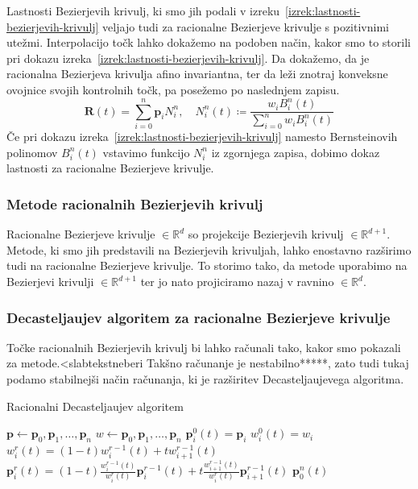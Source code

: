 \documentclass[isrm2, tisk]{fmfdelo}
\newcommand{\R}{\mathbb R}
\newcommand{\p}{\textbf{p}}
\begin{document}
    Lastnosti Bezierjevih krivulj, ki smo jih podali v izreku~\ref{izrek:lastnosti-bezierjevih-krivulj} veljajo tudi za racionalne Bezierjeve krivulje s pozitivnimi utežmi.
    Interpolacijo točk lahko dokažemo na podoben način, kakor smo to storili pri dokazu izreka~\ref{izrek:lastnosti-bezierjevih-krivulj}.
    Da dokažemo, da je racionalna Bezierjeva krivulja afino invariantna, ter da leži znotraj konveksne ovojnice svojih kontrolnih točk, pa posežemo po naslednjem zapisu.
    \[\mathbf{R}(t)=\sum^n_{i=0}\p_i N^n_i, \quad N^n_i(t)\coloneqq \frac{w_i B^n_i(t)}{\sum^n_{i=0}w_i B^n_i(t)}\]
    Če pri dokazu izreka~\ref{izrek:lastnosti-bezierjevih-krivulj} namesto Bernsteinovih polinomov $B_i^n(t)$ vstavimo funkcijo $N^n_i$ iz zgornjega zapisa, dobimo dokaz lastnosti za racionalne Bezierjeve krivulje.

    \subsubsection{Metode racionalnih Bezierjevih krivulj}
    Racionalne Bezierjeve krivulje $\in\R^d$ so projekcije Bezierjevih krivulj $\in\R^{d+1}$.
    Metode, ki smo jih predstavili na Bezierjevih krivuljah, lahko enostavno razširimo tudi na racionalne Bezierjeve krivulje.
    To storimo tako, da metode uporabimo na Bezierjevi krivulji $\in\R^{d+1}$ ter jo nato projiciramo nazaj v ravnino $\in\R^{d}$.

    \subsubsection{Decasteljaujev algoritem za racionalne Bezierjeve krivulje}
    Točke racionalnih Bezierjevih krivulj bi lahko računali tako, kakor smo pokazali za metode.<slabtekstneberi
    Takšno računanje je nestabilno*****, zato tudi tukaj podamo stabilnejši način računanja, ki je razširitev Decasteljaujevega algoritma.

    \begin{algorithm}[h!]
        \caption{Racionalni Decasteljaujev algoritem}
        \begin{algorithmic}
            \State $\p \gets \p_0,\p_1,\dots,\p_n$
            \State $w\gets \p_0,\p_1,\dots,\p_n$
                \State $\p_i^0(t)=\p_i$
                \State $w_i^0(t)=w_i$
            \EndFor
                    \State $w_i^r(t)=(1-t)w_{i}^{r-1}(t)+tw_{i+1}^{r-1}(t)$
                    \State $\p_i^r(t)=(1-t)\frac{w_{i}^{r-1}(t)}{w_{i}^{r}(t)}\p_i^{r-1}(t)+t\frac{w_{i+1}^{r-1}(t)}{w_{i}^{r}(t)}\p_{i+1}^{r-1}(t)$
                \EndFor
            \EndFor
            \State \Return $\p_0^n(t)$
        \end{algorithmic}\label{alg:racionalni-decasteljau}
    \end{algorithm}
\end{document}
